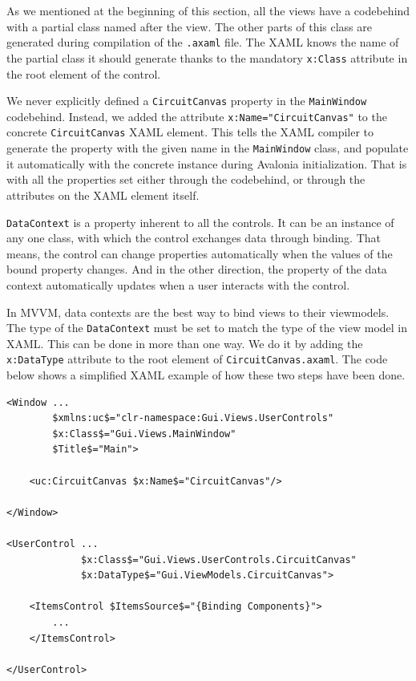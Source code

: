 As we mentioned at the beginning of this section, all the views have a codebehind with a partial class named after the view. The other parts of this class are generated during compilation of the \texttt{.axaml} file. The XAML knows the name of the partial class it should generate thanks to the mandatory \texttt{x:Class} attribute in the root element of the control.

We never explicitly defined a \texttt{CircuitCanvas} property in the \texttt{MainWindow} codebehind. Instead, we added the attribute \texttt{x:Name="CircuitCanvas"} to the concrete \texttt{CircuitCanvas} XAML element. This tells the XAML compiler to generate the property with the given name in the \texttt{MainWindow} class, and populate it automatically with the concrete instance during Avalonia initialization. That is with all the properties set either through the codebehind, or through the attributes on the XAML element itself. \cite{avalonia_name_generator}

\texttt{DataContext} is a property inherent to all the controls. It can be an instance of any one class, with which the control exchanges data through binding. That means, the control can change properties automatically when the values of the bound property changes. And in the other direction, the property of the data context automatically updates when a user interacts with the control. \footnotemark 

In MVVM, data contexts are the best way to bind views to their viewmodels. \cite{avalonia_data_context} The type of the \texttt{DataContext} must be set to match the type of the view model in XAML. This can be done in more than one way. We do it by adding the \texttt{x:DataType} attribute to the root element of \texttt{CircuitCanvas.axaml}. The code below shows a simplified XAML example of how these two steps have been done.

\begin{lstlisting}[language={xaml}, caption={Data context setup in XAML}]
<Window ...
        $xmlns:uc$="clr-namespace:Gui.Views.UserControls"
        $x:Class$="Gui.Views.MainWindow"
        $Title$="Main">

    <uc:CircuitCanvas $x:Name$="CircuitCanvas"/>

</Window>

<UserControl ...
             $x:Class$="Gui.Views.UserControls.CircuitCanvas"
             $x:DataType$="Gui.ViewModels.CircuitCanvas">

    <ItemsControl $ItemsSource$="{Binding Components}">
        ...
    </ItemsControl>
    
</UserControl>

\end{lstlisting}

